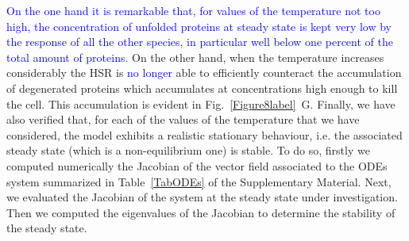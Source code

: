 \documentclass[oneside, 10pt, a4paper, twocolumn]{article}
\begin{document}
\textcolor{blue}{On the one hand it is remarkable that, for values of the temperature not too high, the concentration of unfolded proteins at steady state is kept very low by the response of all the other species, in particular well below one percent of the total amount of proteins.} 
On the other hand, when the temperature increases considerably the HSR is \textcolor{blue}{no longer} able to efficiently counteract the accumulation of degenerated proteins which accumulates at concentrations high enough to kill the cell. This accumulation is evident in Fig.~\ref{Figure8label}~G. 
Finally, we have also verified 
that, for each of the values of the temperature that we have considered, the model exhibits a realistic stationary behaviour, i.e. the associated steady state (which is a non-equilibrium one) is stable. 
To do so, firstly we computed numerically the Jacobian of the vector field associated to the ODEs system summarized in Table~\ref{TabODEs} of the Supplementary Material. 
Next, we evaluated the Jacobian of the system at the steady state 
under investigation.
Then we computed the eigenvalues of the Jacobian to determine the stability of the steady state. 
\end{document}
